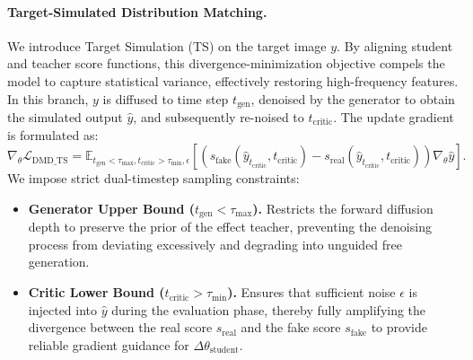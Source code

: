 \paragraph{Target-Simulated Distribution Matching.}
We introduce Target Simulation (TS) on the target image $y$. By aligning student and teacher score functions, this divergence-minimization objective compels the model to capture statistical variance, effectively restoring high-frequency features.
In this branch, $y$ is diffused to time step $t_{\text{gen}}$, denoised by the generator to obtain the simulated output $\hat{y}$, and subsequently re-noised to $t_{\text{critic}}$.
The update gradient is formulated as:
\begin{equation}
\nabla_{\theta}\mathcal{L}_{\text{DMD\_TS}} = \mathbb{E}_{t_{\text{gen}} < \tau_{\text{max}}, t_{\text{critic}} > \tau_{\text{min}}, \epsilon} \left[ \left( s_{\text{fake}}(\hat{y}_{t_{\text{critic}}}, t_{\text{critic}}) - s_{\text{real}}(\hat{y}_{t_{\text{critic}}}, t_{\text{critic}}) \right) \nabla_{\theta}\hat{y} \right].
\end{equation}
We impose strict dual-timestep sampling constraints:
\begin{itemize}
    \item \textbf{Generator Upper Bound ($t_{\text{gen}} < \tau_{\text{max}}$).} Restricts the forward diffusion depth to preserve the prior of the effect teacher, preventing the denoising process from deviating excessively and degrading into unguided free generation.
    \item \textbf{Critic Lower Bound ($t_{\text{critic}} > \tau_{\text{min}}$).} Ensures that sufficient noise $\epsilon$ is injected into $\hat{y}$ during the evaluation phase, thereby fully amplifying the divergence between the real score $s_{\text{real}}$ and the fake score $s_{\text{fake}}$ to provide reliable gradient guidance for $\Delta\theta_{\text{student}}$.
\end{itemize}
